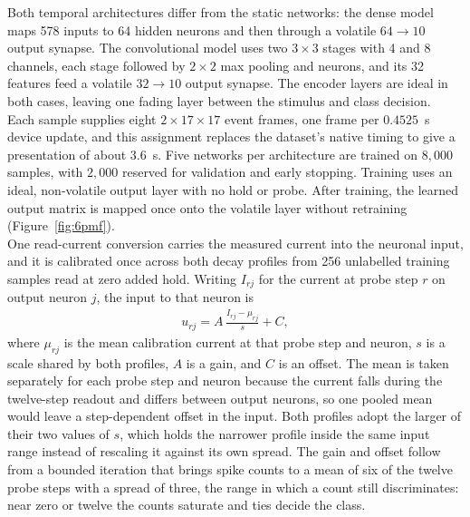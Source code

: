 \noindent Both temporal architectures differ from the static networks: the dense model maps 578 inputs to 64 hidden
neurons and then through a volatile $64\rightarrow10$ output synapse. The convolutional model uses two $3\times3$
stages with 4 and 8 channels, each stage followed by $2\times2$ max pooling and  neurons, and its 32
features feed a volatile $32\rightarrow10$ output synapse. The encoder layers are ideal in both cases, leaving one
fading layer between the stimulus and class decision.\\

\noindent Each  sample supplies eight $2\times17\times17$ event frames, one frame per $0.4525$~s
device update, and this assignment replaces the dataset's native timing to give a presentation of about $3.6$~s.
Five networks per architecture are trained on $8{,}000$ samples, with $2{,}000$ reserved for validation and early
stopping. Training uses an ideal, non-volatile output layer with no hold or probe. After training, the learned output
matrix is mapped once onto the volatile layer without retraining (Figure~\ref{fig:6pmf}).\\

\noindent One read-current conversion carries the measured current into the neuronal input, and it is calibrated once
across both decay profiles from 256 unlabelled training samples read at zero added hold. Writing $I_{rj}$ for the
current at probe step $r$ on output neuron $j$, the input to that neuron is
\begin{align}
    u_{rj} = A\,\frac{I_{rj} - \mu_{rj}}{s} + C,
    \label{eq:6conv}
\end{align}
\noindent where $\mu_{rj}$ is the mean calibration current at that probe step and neuron, $s$ is a scale shared by
both profiles, $A$ is a gain, and $C$ is an offset. The mean is taken separately for each probe step and neuron
because the current falls during the twelve-step readout and differs between output neurons, so one pooled mean would
leave a step-dependent offset in the input. Both profiles adopt the larger of their two values of $s$, which holds
the narrower profile inside the same input range instead of rescaling it against its own spread. The gain and offset
follow from a bounded iteration that brings spike counts to a mean of six of the twelve probe steps with a spread of
three, the range in which a count still discriminates: near zero or twelve the counts saturate and ties decide the
class.\\

